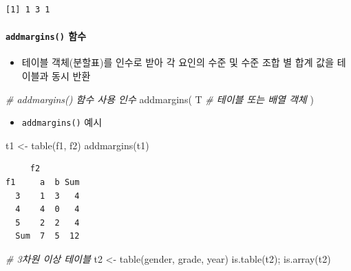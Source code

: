 \documentclass[
  11pt,
]{krantz}
\newenvironment{Shaded}{\begin{snugshade}}{\end{snugshade}}
\newcommand{\CommentTok}[1]{\textcolor[rgb]{0.37,0.37,0.37}{\textit{#1}}}
\newcommand{\FunctionTok}[1]{\textcolor[rgb]{0,0,0}{#1}}
\newcommand{\NormalTok}[1]{#1}
\newcommand{\OtherTok}[1]{\textcolor[rgb]{0.37,0.37,0.37}{#1}}
\providecommand{\tightlist}{%
  \setlength{\itemsep}{0pt}\setlength{\parskip}{0pt}}
\begin{document}
\begin{verbatim}
[1] 1 3 1
\end{verbatim}

\normalsize

\hypertarget{tab-fun2}{%
\paragraph*{\texorpdfstring{\texttt{addmargins()} 함수}{addmargins() 함수}}\label{tab-fun2}}

\begin{itemize}
\tightlist
\item
  테이블 객체(분할표)를 인수로 받아 각 요인의 수준 및 수준 조합 별 합계 값을 테이블과 동시 반환
\end{itemize}

\footnotesize

\begin{Shaded}
\begin{Highlighting}[]
\CommentTok{\# addmargins() 함수 사용 인수}
\FunctionTok{addmargins}\NormalTok{(}
\NormalTok{  T }\CommentTok{\# 테이블 또는 배열 객체 }
\NormalTok{)}
\end{Highlighting}
\end{Shaded}

\normalsize

\begin{itemize}
\tightlist
\item
  \texttt{addmargins()} 예시
\end{itemize}

\footnotesize

\begin{Shaded}
\begin{Highlighting}[]
\NormalTok{t1 }\OtherTok{\textless{}{-}} \FunctionTok{table}\NormalTok{(f1, f2)}
\FunctionTok{addmargins}\NormalTok{(t1)}
\end{Highlighting}
\end{Shaded}

\begin{verbatim}
     f2
f1     a  b Sum
  3    1  3   4
  4    4  0   4
  5    2  2   4
  Sum  7  5  12
\end{verbatim}

\begin{Shaded}
\begin{Highlighting}[]
\CommentTok{\# 3차원 이상 테이블}
\NormalTok{t2 }\OtherTok{\textless{}{-}} \FunctionTok{table}\NormalTok{(gender, grade, year)}
\FunctionTok{is.table}\NormalTok{(t2); }\FunctionTok{is.array}\NormalTok{(t2)}
\end{Highlighting}
\end{Shaded}
\end{document}
